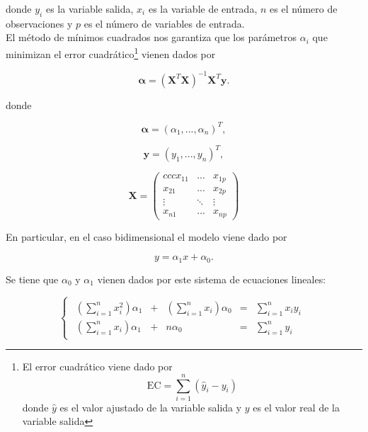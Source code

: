 donde $y_i$ es la variable salida, $x_{i}$ es la variable de entrada, $n$ es el número de observaciones y $p$ es el número de variables de entrada.\\

El método de mínimos cuadrados nos garantiza que los parámetros $\alpha_i$ que minimizan el error cuadrático\footnote{El error cuadrático viene dado por \begin{equation}
\mathrm{EC} = \sum_{i=1}^{n} (\hat{y}_i - y_i) 
\end{equation} 
donde $\hat{y}$ es el valor ajustado de la variable salida y $y$ es el valor real de la variable salida} vienen dados por

\begin{equation}
\boldsymbol{\alpha} = (\mathbf{X}^T \mathbf{X})^{-1} \mathbf{X}^T \mathbf{y}.
\end{equation}

donde 

\begin{equation*}
\mathbf{\alpha} = (\alpha_1,...,\alpha_n)^T,
\end{equation*}

\begin{equation*}
\mathbf{y} = (y_1,...,y_n)^T,
\end{equation*}

\begin{equation*}
\mathbf{X} = \left(\begin{matrix}{ccc}
x_{11} & ... & x_{1p} \\
x_{21} & ... & x_{2p} \\
\vdots & \ddots & \vdots \\
x_{n1} & \dots & x_{np}
\end{matrix}\right)
\end{equation*}

En particular, en el caso bidimensional el modelo viene dado por

\begin{equation}
y = \alpha_1 x + \alpha_0.
\end{equation}

Se tiene que $\alpha_0$ y $\alpha_1$ vienen dados por este sistema de ecuaciones lineales:

\begin{equation}
\begin{cases}
\begin{array}{ccccc}
\left(\displaystyle\sum_{i=1}^{n} x_i^2\right) \alpha_1 & + & \left(\displaystyle\sum_{i=1}^{n} x_i\right) \alpha_0 & = & \displaystyle \sum_{i=1}^{n} x_i y_i \\
 \left(\displaystyle \sum_{i=1}^{n} x_i\right) \alpha_1 & + & n \alpha_0 & = & \displaystyle \sum_{i=1}^{n} y_i
\end{array}
\end{cases}
\end{equation}

